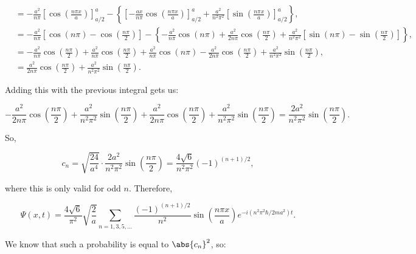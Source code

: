 \begin{parts}
\begin{align*}
    &= -\frac{a^2}{n\pi}\left[ \cos\left( \frac{n\pi x}{a} \right) \right]_{a/2}^a - \left\{ \left[ -\frac{ax}{n\pi}\cos\left( \frac{n\pi x}{a} \right) \right]_{a/2}^a + \frac{a^2}{n^2\pi^2}\left[ \sin\left( \frac{n\pi x}{a} \right) \right]_{a/2}^a \right\}, \\
    &= -\frac{a^2}{n\pi} \left[ \cos(n\pi) - \cos\left( \frac{n\pi}{2} \right) \right] - \left\{ -\frac{a^2}{n\pi}\cos(n\pi) + \frac{a^2}{2n\pi}\cos\left( \frac{n\pi}{2} \right) + \frac{a^2}{n^2\pi^2}\left[ \sin(n\pi) - \sin\left( \frac{n\pi}{2} \right) \right] \right\}, \\
    &= -\frac{a^2}{n\pi}\cos\left( \frac{n\pi}{2} \right) + \frac{a^2}{n\pi}\cos\left( \frac{n\pi}{2} \right) + \frac{a^2}{n\pi}\cos(n\pi) - \frac{a^2}{2n\pi}\cos\left( \frac{n\pi}{2} \right) + \frac{a^2}{n^2\pi^2}\sin\left( \frac{n\pi}{2} \right), \\
    &= \frac{a^2}{2n\pi}\cos\left( \frac{n\pi}{2} \right) + \frac{a^2}{n^2\pi^2}\sin\left( \frac{n\pi}{2} \right).
\end{align*}

Adding this with the previous integral gets us:

\begin{equation*}
    -\frac{a^2}{2n\pi}\cos\left( \frac{n\pi}{2} \right) + \frac{a^2}{n^2\pi^2}\sin\left( \frac{n\pi}{2} \right) + \frac{a^2}{2n\pi}\cos\left( \frac{n\pi}{2} \right) + \frac{a^2}{n^2\pi^2}\sin\left( \frac{n\pi}{2} \right) = \frac{2a^2}{n^2\pi^2}\sin\left( \frac{n\pi}{2} \right).
\end{equation*}

So,

\begin{equation*}
    c_n = \sqrt{\frac{24}{a^4}} \cdot \frac{2a^2}{n^2\pi^2}\sin\left( \frac{n\pi}{2} \right) = \frac{4\sqrt{6}}{n^2\pi^2}(-1)^{(n+1)/2},
\end{equation*}

where this is only valid for odd $n$. Therefore,

\begin{equation*}
    \boxed{\Psi(x,t) = \frac{4\sqrt{6}}{\pi^2}\sqrt{\frac{2}{a}} \sum_{n=1,3,5,\ldots} \frac{(-1)^{(n+1)/2}}{n^2} \sin\left( \frac{n\pi x}{a} \right) e^{-i(n^2\pi^2\hbar/2ma^2)t}.}
\end{equation*}



\item We know that such a probability is equal to $\abs{c_n}^2$, so:


\end{parts}
